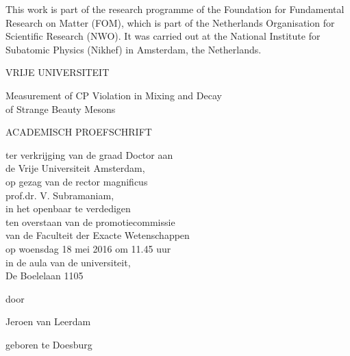 \noindent This work is part of the research programme of the Foundation for Fundamental Research on Matter (FOM), which is part of the
Netherlands Organisation for Scientific Research (NWO). It was carried out at the National Institute for Subatomic Physics (Nikhef) in
Amsterdam, the Netherlands.

\newpage
\thispagestyle{empty}

\begin{center}


VRIJE UNIVERSITEIT


{\Large
Measurement of CP Violation in Mixing and Decay\\
of Strange Beauty Mesons}


ACADEMISCH PROEFSCHRIFT


ter verkrijging van de graad Doctor aan\\
de Vrije Universiteit Amsterdam,\\
op gezag van de rector magnificus\\
prof.dr. V. Subramaniam,\\
in het openbaar te verdedigen\\
ten overstaan van de promotiecommissie\\
van de Faculteit der Exacte Wetenschappen\\
op woensdag 18 mei 2016 om 11.45 uur\\
in de aula van de universiteit,\\
De Boelelaan 1105


door


Jeroen van Leerdam


geboren te Doesburg


\end{center}

